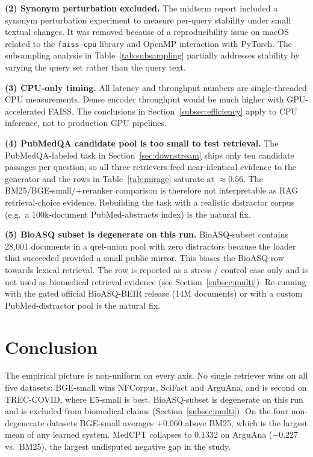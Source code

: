\documentclass[11pt,a4paper]{article}
\begin{document}
\textbf{(2) Synonym perturbation excluded.} The midterm report
included a synonym perturbation experiment to measure per-query
stability under small textual changes. It was removed because of a
reproducibility issue on macOS related to the \texttt{faiss-cpu}
library and OpenMP interaction with PyTorch. The subsampling analysis
in Table~\ref{tab:subsampling} partially addresses stability by
varying the query set rather than the query text.

\textbf{(3) CPU-only timing.} All latency and throughput numbers are
single-threaded CPU measurements. Dense encoder throughput would be
much higher with GPU-accelerated FAISS. The conclusions in
Section~\ref{subsec:efficiency} apply to CPU inference, not to
production GPU pipelines.

\textbf{(4) PubMedQA candidate pool is too small to test retrieval.}
The PubMedQA-labeled task in Section~\ref{sec:downstream} ships only
ten candidate passages per question, so all three retrievers feed
near-identical evidence to the generator and the rows in
Table~\ref{tab:mirage} saturate at $\approx 0.56$. The
BM25/BGE-small/+reranker comparison is therefore not interpretable
as RAG retrieval-choice evidence. Rebuilding the task with a
realistic distractor corpus (e.g.\ a 100k-document PubMed-abstracts
index) is the natural fix.

\textbf{(5) BioASQ subset is degenerate on this run.} BioASQ-subset
contains 28{,}001 documents in a qrel-union pool with zero distractors
because the loader that succeeded provided a small public mirror.
This biases the BioASQ row towards lexical retrieval. The row is
reported as a stress / control case only and is not used as
biomedical retrieval evidence (see
Section~\ref{subsec:multi}). Re-running with the gated official
BioASQ-BEIR release (14M documents) or with a custom
PubMed-distractor pool is the natural fix.

\section{Conclusion}

The empirical picture is non-uniform on every axis. No single
retriever wins on all five datasets: BGE-small wins NFCorpus, SciFact
and ArguAna, and is second on TREC-COVID, where E5-small is best.
BioASQ-subset is degenerate on this run and is excluded from
biomedical claims (Section~\ref{subsec:multi}). On the four
non-degenerate datasets BGE-small averages $+0.060$ above BM25, which
is the largest mean of any learned system. MedCPT collapses to 0.1332
on ArguAna ($-0.227$ vs.\ BM25), the largest undisputed negative gap
in the study.
\end{document}
